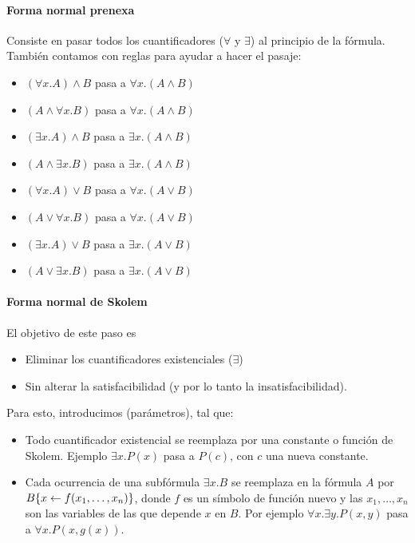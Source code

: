 \paragraph{Forma normal prenexa}

Consiste en pasar todos los cuantificadores ($\forall$ y $\exists$) al principio de la fórmula. También contamos con reglas para ayudar a hacer el pasaje:
\begin{itemize}
  \item $(\forall x.A) \land B$ pasa a $\forall x. (A \land B)$
  \item $(A \land \forall x.B)$ pasa a $\forall x. (A \land B)$
  \item $(\exists x.A) \land B$ pasa a $\exists x. (A \land B)$
  \item $(A \land \exists x.B)$ pasa a $\exists x. (A \land B)$
  \item $(\forall x.A) \lor B$ pasa a $\forall x. (A \lor B)$
  \item $(A \lor \forall x.B)$ pasa a $\forall x. (A \lor B)$
  \item $(\exists x.A) \lor B$ pasa a $\exists x. (A \lor B)$
  \item $(A \lor \exists x.B)$ pasa a $\exists x. (A \lor B)$
\end{itemize}

\paragraph{Forma normal de Skolem}

El objetivo de este paso es
\begin{itemize}
  \item Eliminar los cuantificadores existenciales ($\exists$)
  \item Sin alterar la satisfacibilidad (y por lo tanto la insatisfacibilidad).
\end{itemize}

Para esto, introducimos  (parámetros), tal que:
\begin{itemize}
  \item Todo cuantificador existencial se reemplaza por una constante o función de Skolem. Ejemplo $\exists x. P(x)$ pasa a $P(c)$, con $c$ una nueva constante.
  \item Cada ocurrencia de una subfórmula $\exists x. B$ se reemplaza en la fórmula $A$ por $B\{x \leftarrow f(x_1, \dots, x_n)\}$, donde $f$ es un símbolo de función nuevo y las $x_1, \dots, x_n$ son las variables de las que depende $x$ en $B$. Por ejemplo $\forall x.\exists y. P(x,y)$ pasa a $\forall x. P(x, g(x))$.
\end{itemize}

